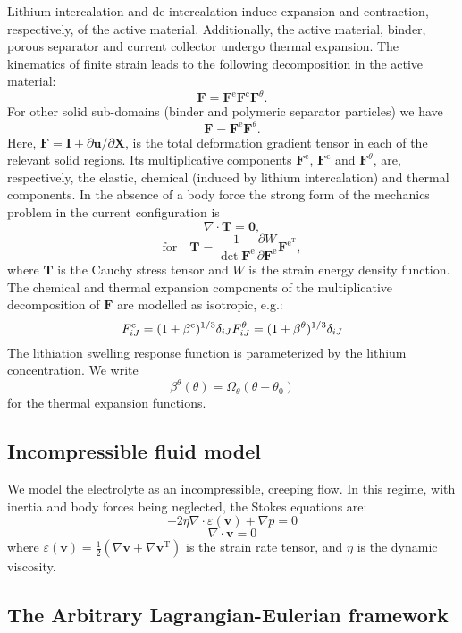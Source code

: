 Lithium intercalation and de-\/intercalation induce expansion and contraction, respectively, of the active material. Additionally, the active material, binder, porous separator and current collector undergo thermal expansion. The kinematics of finite strain leads to the following decomposition in the active material\-: \[ \boldsymbol{F}=\boldsymbol{F}^\text{e}\boldsymbol{F}^\text{c}\boldsymbol{F}^{\theta}. \] For other solid sub-\/domains (binder and polymeric separator particles) we have \[ \boldsymbol{F}=\boldsymbol{F}^\text{e}\boldsymbol{F}^{\theta}. \] Here, $\boldsymbol{F} = \boldsymbol{I} + \partial\boldsymbol{u}/\partial\boldsymbol{X}$, is the total deformation gradient tensor in each of the relevant solid regions. Its multiplicative components $\boldsymbol{F}^\text{e}$, $\boldsymbol{F}^\text{c}$ and $\boldsymbol{F}^{\theta}$, are, respectively, the elastic, chemical (induced by lithium intercalation) and thermal components. In the absence of a body force the strong form of the mechanics problem in the current configuration is \[ \nabla\cdot\boldsymbol{T} = \boldsymbol{0}, \] \[ \text{for}\quad \boldsymbol{T}= \frac{1}{\det{\boldsymbol{F}^\text{e}}}\frac{\partial W}{\partial \boldsymbol{F}^\text{e}}\boldsymbol{F}^{\text{e}^\text{T}}, \] where $\boldsymbol{T}$ is the Cauchy stress tensor and $W$ is the strain energy density function. The chemical and thermal expansion components of the multiplicative decomposition of $\boldsymbol{F}$ are modelled as isotropic, e.\-g.\-: \[ F^{\text{c}}_{iJ}=(1+\beta^{\text{c}})^{1/3}\delta_{iJ} \\ F^{\theta}_{iJ}=(1+\beta^{\theta})^{1/3}\delta_{iJ} \] The lithiation swelling response function is parameterized by the lithium concentration. We write \[ \beta^{\theta}(\theta)=\Omega_{\theta} (\theta-\theta_0) \] for the thermal expansion functions.\hypertarget{battery_particle_section4}{}\subsection{Incompressible fluid model}\label{battery_particle_section4}
We model the electrolyte as an incompressible, creeping flow. In this regime, with inertia and body forces being neglected, the Stokes equations are\-: \[ -2\eta\nabla\cdot\varepsilon(\boldsymbol{v})+\nabla p=0 \] \[ \nabla\cdot\boldsymbol{v}=0 \] where $\varepsilon(\boldsymbol{v})=\frac{1}{2}(\nabla\boldsymbol{v}+\nabla\boldsymbol{v}^\text{T})$ is the strain rate tensor, and $\eta$ is the dynamic viscosity.\hypertarget{battery_particle_section5}{}\subsection{The Arbitrary Lagrangian-\/\-Eulerian framework}\label{battery_particle_section5}
